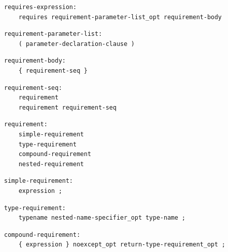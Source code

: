 \noindent\textbf{\texttt{}}\par
\begin{lstlisting}
requires-expression:
    requires requirement-parameter-list_opt requirement-body
\end{lstlisting}

\noindent\textbf{\texttt{}}\par
\begin{lstlisting}
requirement-parameter-list:
    ( parameter-declaration-clause )
\end{lstlisting}

\noindent\textbf{\texttt{}}\par
\begin{lstlisting}
requirement-body:
    { requirement-seq }
\end{lstlisting}

\noindent\textbf{\texttt{}}\par
\begin{lstlisting}
requirement-seq:
    requirement
    requirement requirement-seq
\end{lstlisting}

\noindent\textbf{\texttt{}}\par
\begin{lstlisting}
requirement:
    simple-requirement
    type-requirement
    compound-requirement
    nested-requirement
\end{lstlisting}

\noindent\textbf{\texttt{}}\par
\begin{lstlisting}
simple-requirement:
    expression ;
\end{lstlisting}

\noindent\textbf{\texttt{}}\par
\begin{lstlisting}
type-requirement:
    typename nested-name-specifier_opt type-name ;
\end{lstlisting}

\noindent\textbf{\texttt{}}\par
\begin{lstlisting}
compound-requirement:
    { expression } noexcept_opt return-type-requirement_opt ;
\end{lstlisting}

